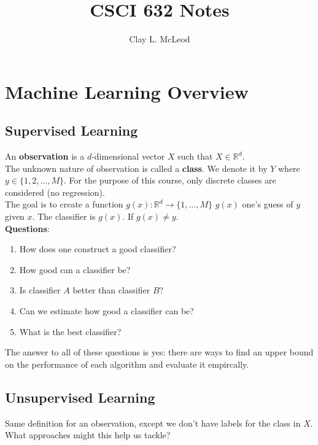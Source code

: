 \documentclass[12pt]{article}
\title{CSCI 632 Notes}
\author{Clay L. McLeod}
\begin{document}
\maketitle

\section{Machine Learning Overview}

\subsection{Supervised Learning}

An \textbf{observation} is a $d$-dimensional vector $X$ such that $X \in \mathbb{R}^{d}$. 
\\

The unknown nature of observation is called a \textbf{class}. We denote it by $Y$ where $y \in \{1, 2, ..., M\}$. For the purpose of this course, only discrete classes are considered (no regression).
\\

The goal is to create a function $g(x): \mathbb{R}^{d} \rightarrow \{1, ..., M\}$ $g(x)$ one's guess of $y$ given $x$. The classifier is $g(x)$. If $g(x) \neq y$.
\\

\textbf{Questions}: 

\begin{enumerate}[noitemsep]
\item How does one construct a good classifier?
\item How good can a classifier be?
\item Is classifier $A$ better than classifier $B$?
\item Can we estimate how good a classifier can be?
\item What is the best classifier?
\end{enumerate}
    
The answer to all of these questions is yes: there are ways to find an upper bound on the performance of each algorithm and evaluate it empircally.

\subsection{Unsupervised Learning}

Same definition for an observation, except we don't have labels for the class in $X$. What approaches might this help us tackle?
\end{document}
